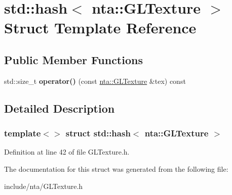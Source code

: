 \hypertarget{structstd_1_1hash_3_01nta_1_1GLTexture_01_4}{}\section{std\+:\+:hash$<$ nta\+:\+:G\+L\+Texture $>$ Struct Template Reference}
\label{structstd_1_1hash_3_01nta_1_1GLTexture_01_4}
\subsection*{Public Member Functions}
\begin{DoxyCompactItemize}
\item 
\mbox{\label{structstd_1_1hash_3_01nta_1_1GLTexture_01_4_ad30941b79bd57380c57ddf530e7ac3bf}} 
std\+::size\+\_\+t {\bfseries operator()} (const \hyperlink{structnta_1_1GLTexture}{nta\+::\+G\+L\+Texture} \&tex) const
\end{DoxyCompactItemize}


\subsection{Detailed Description}
\subsubsection*{template$<$$>$\newline
struct std\+::hash$<$ nta\+::\+G\+L\+Texture $>$}



Definition at line 42 of file G\+L\+Texture.\+h.



The documentation for this struct was generated from the following file\+:\begin{DoxyCompactItemize}
\item 
include/nta/G\+L\+Texture.\+h\end{DoxyCompactItemize}
